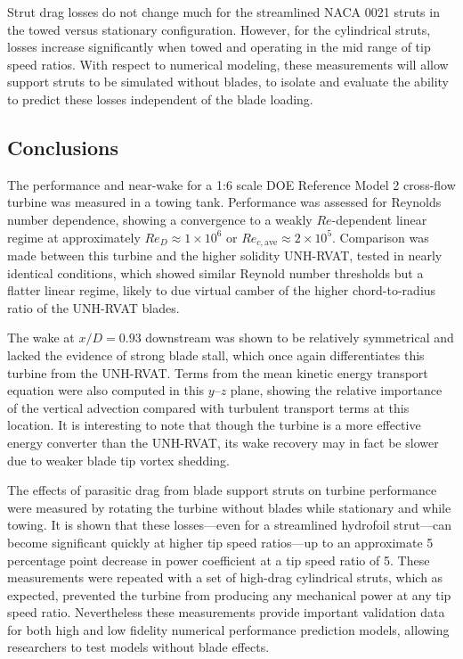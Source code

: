 \documentclass[10pt,letterpaper]{article}
\begin{document}
Strut drag losses do not change much for the streamlined NACA 0021 struts in the
towed versus stationary configuration. However, for the cylindrical struts,
losses increase significantly when towed and operating in the mid range of tip
speed ratios. With respect to numerical modeling, these measurements will allow
support struts to be simulated without blades, to isolate and evaluate the
ability to predict these losses independent of the blade loading.


\subsection*{Conclusions}

The performance and near-wake for a 1:6 scale DOE Reference Model 2 cross-flow
turbine was measured in a towing tank. Performance was assessed for Reynolds
number dependence, showing a convergence to a weakly $Re$-dependent linear
regime at approximately $Re_D \approx 1 \times 10^6$ or $Re_{c,\mathrm{ave}}
\approx 2 \times 10^5$. Comparison was made between this turbine and the higher
solidity UNH-RVAT, tested in nearly identical conditions, which showed similar
Reynold number thresholds but a flatter linear regime, likely to due virtual
camber of the higher chord-to-radius ratio of the UNH-RVAT blades.

The wake at $x/D=0.93$ downstream was shown to be relatively symmetrical and
lacked the evidence of strong blade stall, which once again differentiates this
turbine from the UNH-RVAT. Terms from the mean kinetic energy transport equation
were also computed in this $y$--$z$ plane, showing the relative importance of
the vertical advection compared with turbulent transport terms at this location.
It is interesting to note that though the turbine is a more effective energy
converter than the UNH-RVAT, its wake recovery may in fact be slower due to
weaker blade tip vortex shedding.

The effects of parasitic drag from blade support struts on turbine performance
were measured by rotating the turbine without blades while stationary and while
towing. It is shown that these losses---even for a streamlined hydrofoil
strut---can become significant quickly at higher tip speed ratios---up to an
approximate 5 percentage point decrease in power coefficient at a tip speed
ratio of 5. These measurements were repeated with a set of high-drag cylindrical
struts, which as expected, prevented the turbine from producing any mechanical
power at any tip speed ratio. Nevertheless these measurements provide important
validation data for both high and low fidelity numerical performance prediction
models, allowing researchers to test models without blade effects.
\end{document}
